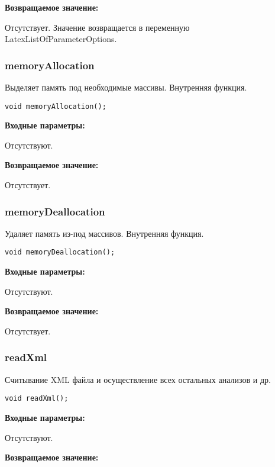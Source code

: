 \textbf{Возвращаемое значение:}

Отсутствует. Значение возвращается в переменную LatexListOfParameterOptions.


\subsubsection{memoryAllocation}\label{memoryAllocation}

Выделяет память под необходимые массивы. Внутренняя функция.


\begin{lstlisting}[label=code_syntax_memoryAllocation,caption=Синтаксис]
void memoryAllocation();
\end{lstlisting}

\textbf{Входные параметры:}

Отсутствуют.

\textbf{Возвращаемое значение:}

Отсутствует.


\subsubsection{memoryDeallocation}\label{memoryDeallocation}

Удаляет память из-под массивов. Внутренняя функция.


\begin{lstlisting}[label=code_syntax_memoryDeallocation,caption=Синтаксис]
void memoryDeallocation();
\end{lstlisting}

\textbf{Входные параметры:}

Отсутствуют.

\textbf{Возвращаемое значение:}

Отсутствует.


\subsubsection{readXml}\label{readXml}

Считывание XML файла и осуществление всех остальных анализов и др.


\begin{lstlisting}[label=code_syntax_readXml,caption=Синтаксис]
void readXml();
\end{lstlisting}

\textbf{Входные параметры:}

Отсутствуют.

\textbf{Возвращаемое значение:}

